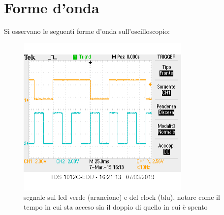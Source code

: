 \documentclass[12pt,a4paper]{article}
\begin{document}
\newpage



\section{Forme d'onda}
Si osservano le seguenti forme d'onda sull'oscilloscopio:
\begin{figure}\centering
	\includegraphics[scale=0.9]{green.png}
	\caption{ segnale sul led verde (arancione) e del clock (blu), notare come il tempo in cui sta acceso sia il doppio di quello in cui è spento}
	
\end{figure}
\end{document}

